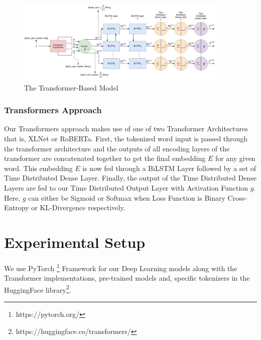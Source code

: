 \documentclass[letterpaper]{article}
\begin{document}
\begin{figure}[t]
\centering
\includegraphics[width=0.9\textwidth]{TRANSFORMER_MODEL.jpg} %
\caption{The Transformer-Based Model}
\label{The Transformer-Based Model}
\end{figure}

\subsubsection{Transformers Approach}
Our Transformers approach makes use of one of two Transformer Architectures that is, XLNet or RoBERTa. First, the tokenized word input is passed through the transformer architecture and the outputs of all encoding layers of the transformer are concatenated together to get the final embedding $E$ for any given word. This embedding $E$ is now fed through a BiLSTM Layer followed by a set of Time Distributed Dense Layer. Finally, the output of the Time Distributed Dense Layers are fed to our Time Distributed Output Layer with Activation Function $g$. Here, $g$ can either be Sigmoid or Softmax when Loss Function is Binary Cross-Entropy or KL-Divergence respectively.

\section{Experimental Setup}
We use PyTorch \footnote{https://pytorch.org/} Framework for our Deep Learning models along with the Transformer implementations, pre-trained models and, specific tokenizers in the HuggingFace library\footnote{https://huggingface.co/transformers/}.\\
\end{document}
